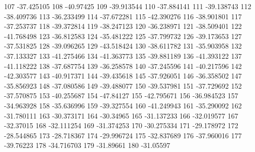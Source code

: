 107                      -37.425105
108                       -40.97425
109                      -39.913544
110                      -37.884141
111                      -39.138743
112                      -38.409736
113                      -36.233499
114                      -37.672281
115                      -42.390276
116                      -38.901801
117                      -37.253737
118                      -39.372814
119                      -38.247123
120                      -36.238971
121                      -38.509401
122                      -41.768498
123                      -36.812583
124                      -35.481222
125                      -37.799732
126                      -39.173653
127                      -37.531825
128                      -39.096265
129                      -43.518424
130                      -38.611782
131                      -35.903958
132                      -37.133327
133                      -41.275466
134                      -41.363773
135                      -39.881189
136                      -41.393122
137                      -41.118222
138                      -37.687754
139                      -36.258578
140                      -37.245596
141                      -40.217596
142                      -42.303577
143                      -40.917371
144                      -39.435618
145                      -37.926051
146                      -36.358502
147                      -35.856923
148                      -37.080586
149                      -39.488077
150                      -39.537981
151                      -37.729692
152                      -37.570875
153                      -40.255687
154                       -47.84127
155                      -42.795671
156                      -36.984523
157                      -34.963928
158                      -35.636996
159                      -39.327554
160                      -41.249943
161                      -35.290092
162                      -31.780111
163                      -30.373171
164                       -30.34965
165                      -31.137233
166                      -32.019577
167                       -32.37015
168                      -32.111254
169                      -31.374253
170                      -30.275334
171                      -29.178972
172                      -28.544865
173                      -28.718367
174                      -29.996724
175                      -32.837689
176                      -37.960016
177                       -39.76223
178                      -34.716703
179                       -31.89661
180                       -31.05597